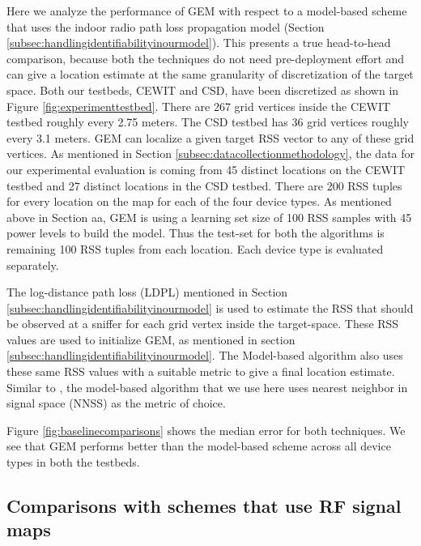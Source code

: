 Here we analyze the performance of GEM with respect to a model-based scheme that uses the indoor radio path loss propagation model (Section \ref{subsec:handlingidentifiabilityinourmodel}). This presents a true head-to-head comparison, because both the techniques do not need pre-deployment effort and can  give a location estimate at the same granularity of discretization of the target space. Both our testbeds, CEWIT and CSD, have been discretized as shown in Figure \ref{fig:experimenttestbed}. There are 267 grid vertices inside the CEWIT testbed roughly every 2.75 meters. The CSD testbed has 36 grid vertices roughly every 3.1 meters. GEM can localize a given target RSS vector to any of these grid vertices. As mentioned in Section \ref{subsec:datacollectionmethodology}, the data for our experimental evaluation is coming from 45 distinct locations on the CEWIT testbed and 27 distinct locations in the CSD testbed. There are 200 RSS tuples for every location on the map for each of the four device types. As mentioned above in Section aa, GEM is using a learning set size of 100 RSS samples with 45 power levels to build the model. Thus the test-set for both the algorithms is remaining 100 RSS tuples from each location. Each device type is evaluated separately.

The log-distance path loss (LDPL) mentioned in Section \ref{subsec:handlingidentifiabilityinourmodel} is used to estimate the RSS that should be observed at a sniffer for each grid vertex inside the target-space. These RSS values are used to initialize GEM, as mentioned in section \ref{subsec:handlingidentifiabilityinourmodel}. The Model-based algorithm also uses these same RSS values with a suitable metric to give a final location estimate. Similar to \cite{Bahl00radar:an}, the model-based algorithm that we use here uses nearest neighbor in signal space (NNSS) as the metric of choice. 

Figure \ref{fig:baselinecomparisons} shows the median error for both techniques. We see that GEM performs better than the model-based scheme across all device types in both the testbeds.

\subsection{Comparisons with schemes that use RF signal maps}
\label{subsec:comparisonswithschemesthatuserfsignalmaps}

